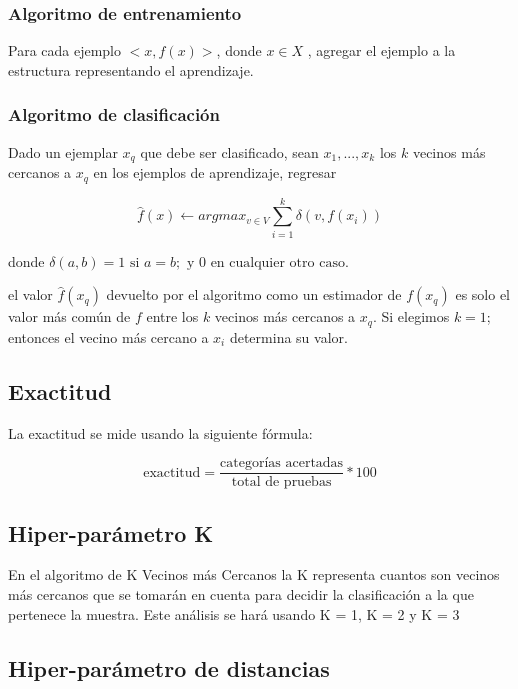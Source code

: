 \documentclass[conference]{IEEEtran}
\begin{document}
\subsubsection{Algoritmo de entrenamiento}

Para cada ejemplo $< x , f ( x ) >$, donde $x \in X$ , agregar el ejemplo a la estructura representando el aprendizaje.

\subsubsection{Algoritmo de clasificación}

Dado un ejemplar $x_q$ que debe ser clasificado, sean $x_1, ..., x_k$ los $k$ vecinos más cercanos a $x_q$ en los ejemplos de aprendizaje, regresar

\[ {\hat {f}}(x)\leftarrow argmax_{v\in V}\sum _{i=1}^{k}\delta (v,f(x_{i})) \]

donde {\displaystyle $\delta(a,b)=1{\mbox{ si }}a=b;{\mbox{ y }}0{\mbox{ en cualquier otro caso.}}$}

el valor ${\hat {f}}(x_{q})$ devuelto por el algoritmo como un estimador de ${\displaystyle f(x_{q})}$ es solo el valor más común de ${\displaystyle f}$ entre los ${\displaystyle k}$ vecinos más cercanos a ${\displaystyle x_{q}}$. Si elegimos ${\displaystyle k=1}$; entonces el vecino más cercano a ${\displaystyle x_{i}}$ determina su valor.

\subsection{Exactitud}

La exactitud se mide usando la siguiente fórmula:

\[ \textrm{exactitud} = \frac{\textrm{categorías acertadas}}{\textrm{total de pruebas}} * \textrm{100} \]

\subsection{Hiper-parámetro K}

En el algoritmo de K Vecinos más Cercanos la K representa cuantos son vecinos más cercanos que se tomarán en cuenta para decidir la clasificación a la que pertenece la muestra. Este análisis se hará usando K = 1, K = 2 y K = 3

\subsection{Hiper-parámetro de distancias}
\end{document}
